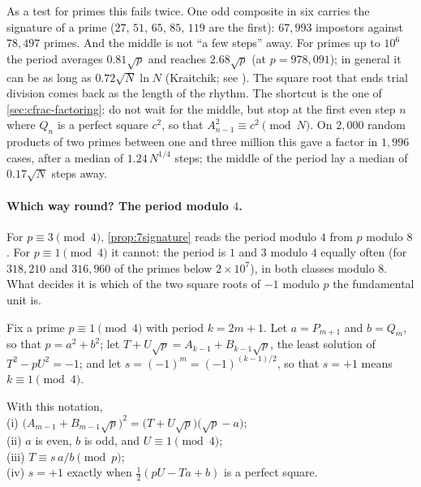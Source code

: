 As a test for primes this fails twice. One odd composite in six carries the signature of a prime
($27$, $51$, $65$, $85$, $119$ are the first): $67{,}993$ impostors against $78{,}497$ primes. And the
middle is not ``a few steps'' away. For primes up to $10^{6}$ the period averages $0.81\sqrt p$ and
reaches $2.68\sqrt p$ (at $p=978{,}091$); in general it can be as long as $0.72\sqrt N\ln N$
(Kraitchik; see \citep{Elia2019}). The square root that ends trial division comes back as the length of
the rhythm. The shortcut is the one of \cref{sec:cfrac-factoring}: do not wait for the middle, but stop at the first
even step $n$ where $Q_n$ is a perfect square $c^{2}$, so that $A_{n-1}^{2}\equiv c^{2}\pmod N$. On
$2{,}000$ random products of two primes between one and three million this gave a factor in $1{,}996$
cases, after a median of $1.24\,N^{1/4}$ steps; the middle of the period lay a median of
$0.17\sqrt N$ steps away.

\paragraph{Which way round? The period modulo $4$.} For $p\equiv3\pmod4$,
\cref{prop:7signature} reads the period modulo $4$ from $p$ modulo $8$. For $p\equiv1\pmod4$
it cannot: the period is $1$ and $3$ modulo $4$ equally often (for $318{,}210$ and $316{,}960$ of the
primes below $2\times10^{7}$), in both classes modulo $8$. What decides it is which of the two square
roots of $-1$ modulo $p$ the fundamental unit is.

Fix a prime $p\equiv1\pmod4$ with period $k=2m+1$. Let $a=P_{m+1}$ and $b=Q_m$, so that $p=a^{2}+b^{2}$;
let $T+U\sqrt p=A_{k-1}+B_{k-1}\sqrt p$, the least solution of $T^{2}-pU^{2}=-1$; and let
$s=(-1)^{m}=(-1)^{(k-1)/2}$, so that $s=+1$ means $k\equiv1\pmod4$.

\begin{theorem}\label{thm:7middle}
With this notation,\\
(i) $\bigl(A_{m-1}+B_{m-1}\sqrt p\bigr)^{2}=\bigl(T+U\sqrt p\bigr)\bigl(\sqrt p-a\bigr)$;\\
(ii) $a$ is even, $b$ is odd, and $U\equiv1\pmod4$;\\
(iii) $T\equiv s\,a/b\pmod p$;\\
(iv) $s=+1$ exactly when $\tfrac12(pU-Ta+b)$ is a perfect square.
\end{theorem}

